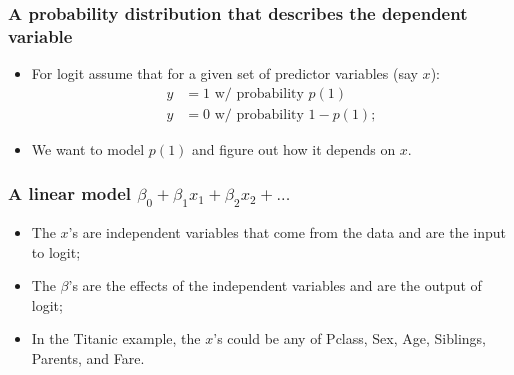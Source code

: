 \documentclass[aspectratio=169]{beamer}
\begin{document}
\begin{frame}
\frametitle{A probability distribution that describes the dependent variable}

\begin{itemize}
\item For logit assume that for a given set of predictor variables (say $x$):
\begin{align*}
y &= 1 \mbox{ w/ probability }p(1)\\
y &= 0 \mbox{ w/ probability }1 - p(1);
\end{align*}
\bigskip
\item We want to model $p(1)$ and figure out how it depends on $x$.

\end{itemize}
\end{frame}

\begin{frame}
\frametitle{A linear model $\beta_0 + \beta_1x_1 + \beta_2x_2 + ...$}

\begin{itemize}
\item The $x$'s are independent variables that come from the data and are the input to logit;
\bigskip
\bigskip
\item The $\beta$'s are the effects of the independent variables and are the output of logit;
\bigskip
\bigskip
\item In the Titanic example, the $x$'s could be any of Pclass, Sex, Age, Siblings, Parents, and Fare.

\end{itemize}
\end{frame}
\end{document}
